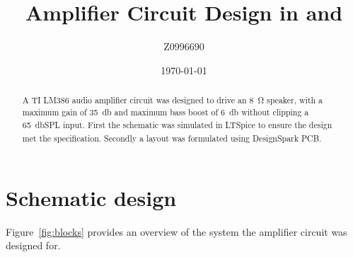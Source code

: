 \documentclass[a4paper,10pt]{article}
\title{Amplifier Circuit Design in \LTSpice and \DesignSparkPcb}
\author{Z0996690}
\date{\today}
\newcommand{\DesignSparkPcb}{DesignSpark
	PCB\textsuperscript{\textregistered}\xspace}
\newcommand{\LTSpice}{LTSpice\textsuperscript{\textregistered}\xspace}
\begin{document}

\begin{abstract}
	A TI LM386 audio amplifier circuit was designed to drive an \SI{8}{\ohm}
	speaker, with a maximum gain of \SI{35}{\decibel} and maximum bass boost of
	\SI{6}{\decibel} without clipping a \SI{65}{\decibel}SPL input. First the 
	schematic was simulated in \LTSpice to ensure the design met the
	specification. Secondly a layout was formulated using \DesignSparkPcb.
\end{abstract}

\section{Schematic design}

Figure~\ref{fig:blocks} provides an overview of the system the amplifier
circuit was designed for.
\end{document}
